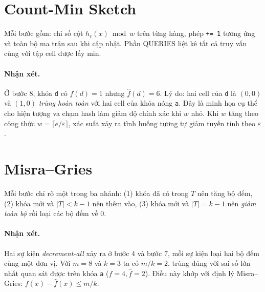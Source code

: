 \section{Count-Min Sketch}
\label{sec:trace:cms}

Mỗi bước gồm: chỉ số cột $h_r(x) \bmod w$ trên từng hàng, phép
\texttt{+= 1} tương ứng và toàn bộ ma trận sau khi cập nhật. Phần
\textsc{QUERIES} liệt kê tất cả truy vấn cùng với tập cell được lấy min.



\paragraph{Nhận xét.}
Ở bước 8, khóa \texttt{d} có $f(d)=1$ nhưng $\hat f(d)=6$. Lý do:
hai cell của \texttt{d} là $(0,0)$ và $(1,0)$ \emph{trùng hoàn toàn}
với hai cell của khóa nóng \texttt{a}. Đây là minh họa cụ thể cho
hiện tượng va chạm hash làm giảm độ chính xác khi $w$ nhỏ. Khi $w$ tăng
theo công thức $w = \lceil e/\varepsilon \rceil$, xác suất xảy ra tình
huống tương tự giảm tuyến tính theo $\varepsilon$.

\section{Misra--Gries}
\label{sec:trace:mg}

Mỗi bước chỉ rõ một trong ba nhánh: (1) khóa đã có trong $T$ nên tăng
bộ đếm, (2) khóa mới và $|T| < k-1$ nên thêm vào, (3) khóa mới và
$|T| = k-1$ nên \emph{giảm toàn bộ} rồi loại các bộ đếm về 0.



\paragraph{Nhận xét.}
Hai sự kiện \emph{decrement-all} xảy ra ở bước 4 và bước 7, mỗi sự kiện
loại hai bộ đếm cùng một đơn vị. Với $m=8$ và $k=3$ ta có $m/k = 2$,
trùng đúng với sai số lớn nhất quan sát được trên khóa \texttt{a}
($f=4, \hat f=2$). Điều này khớp với định lý Misra--Gries:
$f(x) - \hat f(x) \le m/k$.


